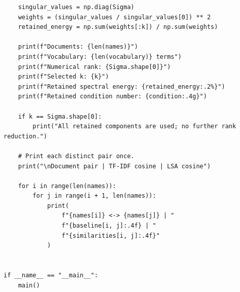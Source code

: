 \documentclass[12pt,a4paper]{report}
\theoremstyle{plain}
\theoremstyle{definition}
\theoremstyle{remark}
\theoremstyle{definition}
\begin{document}
\begin{lstlisting}
    singular_values = np.diag(Sigma)
    weights = (singular_values / singular_values[0]) ** 2
    retained_energy = np.sum(weights[:k]) / np.sum(weights)

    print(f"Documents: {len(names)}")
    print(f"Vocabulary: {len(vocabulary)} terms")
    print(f"Numerical rank: {Sigma.shape[0]}")
    print(f"Selected k: {k}")
    print(f"Retained spectral energy: {retained_energy:.2%}")
    print(f"Retained condition number: {condition:.4g}")

    if k == Sigma.shape[0]:
        print("All retained components are used; no further rank reduction.")

    # Print each distinct pair once.
    print("\nDocument pair | TF-IDF cosine | LSA cosine")

    for i in range(len(names)):
        for j in range(i + 1, len(names)):
            print(
                f"{names[i]} <-> {names[j]} | "
                f"{baseline[i, j]:.4f} | "
                f"{similarities[i, j]:.4f}"
            )


if __name__ == "__main__":
    main()
\end{lstlisting}
\end{document}
